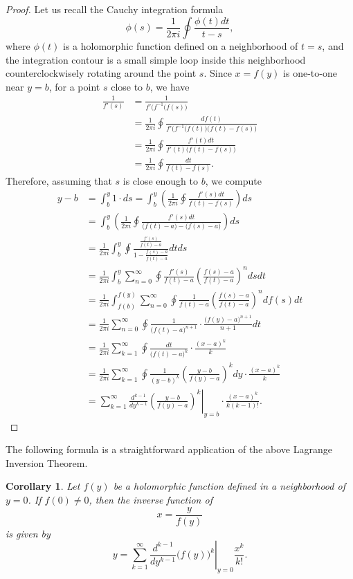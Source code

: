 \documentclass{amsart}
\newtheorem{cor}[thm]{Corollary}
\theoremstyle{definition}
\numberwithin{equation}{section}
\numberwithin{figure}{section}
\begin{document}
\begin{appendix}
\begin{proof}
Let us recall the Cauchy integration formula
$$
\phi(s) = \frac{1}{2\pi i} \oint \frac{\phi(t)dt}{t-s},
$$
where $\phi(t)$ is a holomorphic function 
defined on a neighborhood of $t=s$, and 
the integration contour is a small simple loop 
inside this neighborhood
counterclockwisely rotating around the point $s$.
Since $x=f(y)$ is one-to-one near $y=b$, 
for a point $s$ close to $b$, we have
\begin{align*}
\frac{1}{f'(s)} 
&= \frac{1}{f'\big(f^{-1}(f(s)\big)}
\\
&=
\frac{1}{2\pi i}\oint \frac{df(t)}
{f'\big(f^{-1}(f(t)\big)\big(f(t)-f(s)\big)}
\\
&=
\frac{1}{2\pi i}\oint \frac{f'(t)dt}
{f'(t)\big(f(t)-f(s)\big)}
\\
&=
\frac{1}{2\pi i}\oint \frac{dt}
{f(t)-f(s)}.
\end{align*}
Therefore, assuming that $s$ is close enough to $b$,
we compute
\begin{align*}
y-b
&=
\int_b ^y 1\cdot ds 
=
\int_b ^y  
\left(\frac{1}{2\pi i}\oint \frac{f'(s)dt}
{f(t)-f(s)}
\right)
ds
\\
&=
\int_b ^y  
\left(\frac{1}{2\pi i}\oint \frac{f'(s)dt}
{\big(f(t)-a\big)-\big(f(s)-a\big)}
\right)
ds
\\
&=
\frac{1}{2\pi i}\int_b ^y\oint 
\frac{\frac{f'(s)}{f(t)-a}}
{1-\frac{f(s)-a}{f(t)-a}}
dtds
\\
&=
\frac{1}{2\pi i}\int_b ^y
\sum_{n=0} ^\infty
\oint
\frac{f'(s)}{f(t)-a}
\left(
\frac{f(s)-a}{f(t)-a}
\right)^n
dsdt
\\
&=
\frac{1}{2\pi i}\int_{f(b)} ^{f(y)}
\sum_{n=0} ^\infty
\oint
\frac{1}{f(t)-a}
\left(
\frac{f(s)-a}{f(t)-a}
\right)^n
df(s)dt
\\
&=
\frac{1}{2\pi i}\sum_{n=0} ^\infty
\oint
\frac{1}{\big(f(t)-a\big)^{n+1}}\cdot
\frac{\big(f(y)-a\big)^{n+1}}{n+1}dt
\\
&=
\frac{1}{2\pi i}\sum_{k=1} ^\infty
\oint
\frac{dt}{\big(f(t)-a\big)^k}
\cdot \frac{(x-a)^k}{k}
\\
&=
\frac{1}{2\pi i}\sum_{k=1} ^\infty
\oint
\frac{1}{(y-b)^k}
\left(
\frac{y-b}
{f(y)-a}
\right)^k
dy
\cdot \frac{(x-a)^k}{k}
\\
&=
\sum_{k=1} ^\infty
\left.
\frac{d^{k-1}}{dy^{k-1}}
\left(
\frac{y-b}
{f(y)-a}
\right)^k
\right|_{y=b}
\cdot \frac{(x-a)^k}{k(k-1)!}.
\end{align*}
\end{proof}


The following formula is a straightforward
application of the above
Lagrange Inversion Theorem.

\begin{cor} Let $f(y)$ be a holomorphic function
defined in a neighborhood of $y=0$. If $f(0)\ne 0$,
then the inverse function of 
$$
x=\frac{y}{f(y)} 
$$
 is given by
\begin{equation}
\label{eq:lif}
y=\sum_{k=1} ^\infty
\left.
\frac{d^{k-1}}{dy^{k-1}}
\big(f(y)\big)^k
\right|_{y=0}
\frac{x^k}{k!}.
\end{equation}
\end{cor}


\end{appendix}
\end{document}

